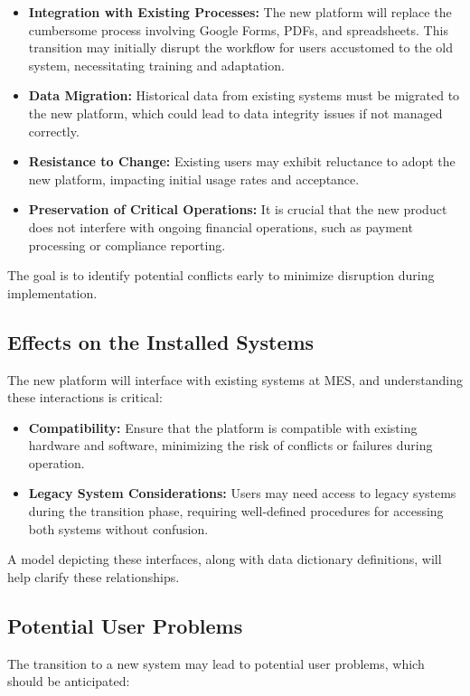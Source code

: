 \documentclass[12pt]{article}
\begin{document}
\begin{itemize}
    \item \textbf{Integration with Existing Processes:} The new platform will replace the cumbersome process involving Google Forms, PDFs, and spreadsheets. This transition may initially disrupt the workflow for users accustomed to the old system, necessitating training and adaptation.
    \item \textbf{Data Migration:} Historical data from existing systems must be migrated to the new platform, which could lead to data integrity issues if not managed correctly.
    \item \textbf{Resistance to Change:} Existing users may exhibit reluctance to adopt the new platform, impacting initial usage rates and acceptance.
    \item \textbf{Preservation of Critical Operations:} It is crucial that the new product does not interfere with ongoing financial operations, such as payment processing or compliance reporting.
\end{itemize}

The goal is to identify potential conflicts early to minimize disruption during implementation.

\subsection{Effects on the Installed Systems}
The new platform will interface with existing systems at MES, and understanding these interactions is critical:

\begin{itemize}
    \item \textbf{Compatibility:} Ensure that the platform is compatible with existing hardware and software, minimizing the risk of conflicts or failures during operation.
    \item \textbf{Legacy System Considerations:} Users may need access to legacy systems during the transition phase, requiring well-defined procedures for accessing both systems without confusion.
\end{itemize}

A model depicting these interfaces, along with data dictionary definitions, will help clarify these relationships.

\subsection{Potential User Problems}
The transition to a new system may lead to potential user problems, which should be anticipated:
\end{document}
